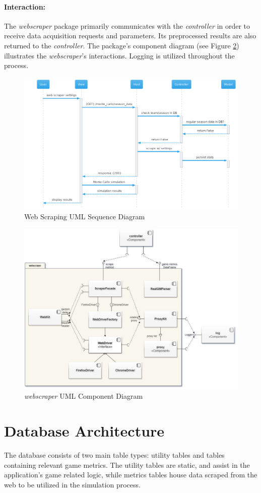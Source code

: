 \documentclass{thesis-ekf}
\theoremstyle{definition}
\theoremstyle{remark}
\begin{document}
{\paragraph{Interaction:}
The \emph{webscraper} package primarily communicates with the \emph{controller} in order to receive data acquisition requests and parameters. Its preprocessed results are also returned to the \emph{controller}. The package's component diagram (see Figure \ref{img-webscraper-component}) illustrates the \emph{webscraper}'s interactions. Logging is utilized throughout the process.
\begin{figure}[th!]
	\centering
	\includegraphics[width=0.9\linewidth]{img/sequence/scraping/scraping_caerilian}
	\caption{Web Scraping UML Sequence Diagram}
	\label{img-scraping-sequence}
\end{figure}
\begin{figure}[th!]
	\centering
	\includegraphics[width=0.7\linewidth]{img/component/component_webscraper}
	\caption{\emph{webscraper} UML Component Diagram}
	\label{img-webscraper-component}
\end{figure}

\section{Database Architecture}
The database consists of two main table types: utility tables and tables containing relevant game metrics. The utility tables are static, and assist in the application's game related logic, while metrics tables house data scraped from the web to be utilized in the simulation process. 

}
\end{document}
